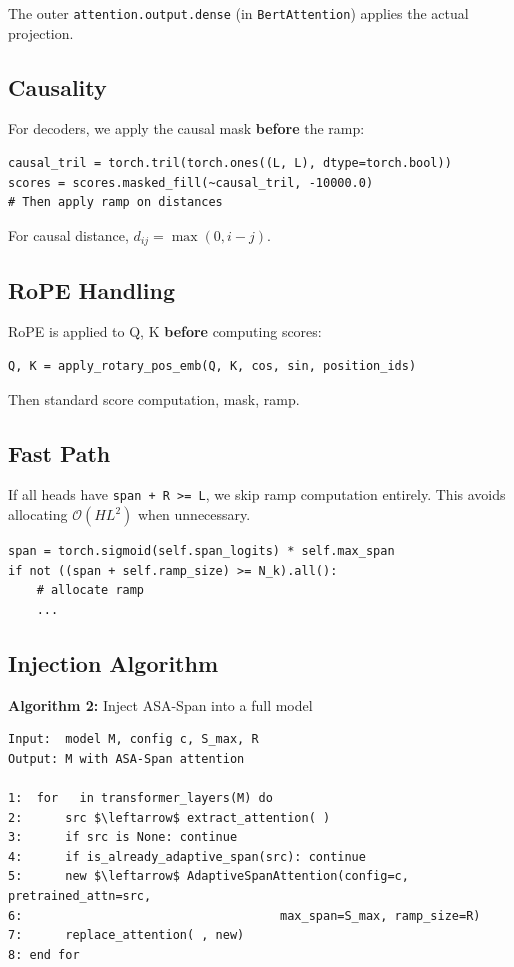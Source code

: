 The outer \texttt{attention.output.dense} (in \texttt{BertAttention}) applies the actual 
projection.

\subsection{Causality}

For decoders, we apply the causal mask \textbf{before} the ramp:

\begin{lstlisting}
causal_tril = torch.tril(torch.ones((L, L), dtype=torch.bool))
scores = scores.masked_fill(~causal_tril, -10000.0)
# Then apply ramp on distances
\end{lstlisting}

For causal distance, $d_{ij} = \max(0, i - j)$.

\subsection{RoPE Handling}

RoPE is applied to Q, K \textbf{before} computing scores:

\begin{lstlisting}
Q, K = apply_rotary_pos_emb(Q, K, cos, sin, position_ids)
\end{lstlisting}

Then standard score computation, mask, ramp.

\subsection{Fast Path}

If all heads have \texttt{span + R >= L}, we skip ramp computation entirely. This 
avoids allocating $\mathcal{O}(H L^2)$ when unnecessary.

\begin{lstlisting}
span = torch.sigmoid(self.span_logits) * self.max_span
if not ((span + self.ramp_size) >= N_k).all():
    # allocate ramp
    ...
\end{lstlisting}

\subsection{Injection Algorithm}

\textbf{Algorithm 2:} Inject ASA-Span into a full model
\begin{lstlisting}
Input:  model M, config c, S_max, R
Output: M with ASA-Span attention

1:  for   in transformer_layers(M) do
2:      src $\leftarrow$ extract_attention( )
3:      if src is None: continue
4:      if is_already_adaptive_span(src): continue
5:      new $\leftarrow$ AdaptiveSpanAttention(config=c, pretrained_attn=src,
6:                                    max_span=S_max, ramp_size=R)
7:      replace_attention( , new)
8: end for
\end{lstlisting}

